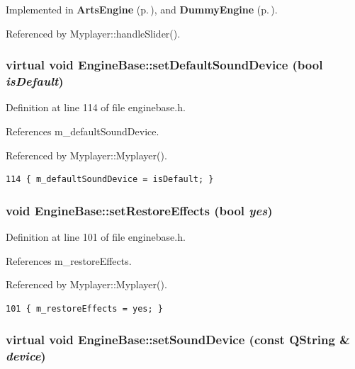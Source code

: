 Implemented in {\bf Arts\-Engine} {\rm (p.\,\pageref{classArtsEngine_ArtsEnginei4})}, and {\bf Dummy\-Engine} {\rm (p.\,\pageref{classDummyEngine_DummyEngined11})}.

Referenced by Myplayer::handle\-Slider().
\subsubsection{\setlength{\rightskip}{0pt plus 5cm}virtual void Engine\-Base::set\-Default\-Sound\-Device (bool {\em is\-Default})\hspace{0.3cm}{\tt  [inline, virtual]}}\label{classEngineBase_EngineBasea27}




Definition at line 114 of file enginebase.h.

References m\_\-default\-Sound\-Device.

Referenced by Myplayer::Myplayer().



\footnotesize\begin{verbatim}114 { m_defaultSoundDevice = isDefault; }
\end{verbatim}\normalsize 
{}
\subsubsection{\setlength{\rightskip}{0pt plus 5cm}void Engine\-Base::set\-Restore\-Effects (bool {\em yes})\hspace{0.3cm}{\tt  [inline]}}\label{classEngineBase_EngineBasea15}




Definition at line 101 of file enginebase.h.

References m\_\-restore\-Effects.

Referenced by Myplayer::Myplayer().



\footnotesize\begin{verbatim}101 { m_restoreEffects = yes; }
\end{verbatim}\normalsize 
{}
\subsubsection{\setlength{\rightskip}{0pt plus 5cm}virtual void Engine\-Base::set\-Sound\-Device (const QString \& {\em device})\hspace{0.3cm}{\tt  [inline, virtual]}}\label{classEngineBase_EngineBasea26}




